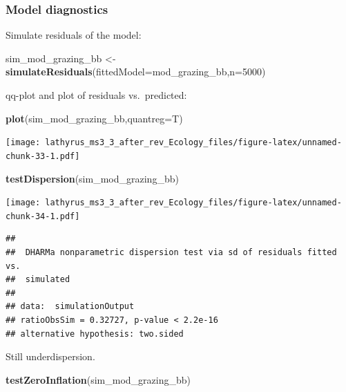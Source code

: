 \documentclass[
]{article}
\newenvironment{Shaded}{\begin{snugshade}}{\end{snugshade}}
\newcommand{\DataTypeTok}[1]{\textcolor[rgb]{0.13,0.29,0.53}{#1}}
\newcommand{\DecValTok}[1]{\textcolor[rgb]{0.00,0.00,0.81}{#1}}
\newcommand{\KeywordTok}[1]{\textcolor[rgb]{0.13,0.29,0.53}{\textbf{#1}}}
\newcommand{\NormalTok}[1]{#1}
\newcommand{\StringTok}[1]{\textcolor[rgb]{0.31,0.60,0.02}{#1}}
\begin{document}
\hypertarget{model-diagnostics-3}{%
\subsubsection{Model diagnostics}\label{model-diagnostics-3}}

Simulate residuals of the model:

\begin{Shaded}
\begin{Highlighting}[]
\NormalTok{sim\_mod\_grazing\_bb \textless{}{-}}\StringTok{ }\KeywordTok{simulateResiduals}\NormalTok{(}\DataTypeTok{fittedModel=}\NormalTok{mod\_grazing\_bb,}\DataTypeTok{n=}\DecValTok{5000}\NormalTok{)}
\end{Highlighting}
\end{Shaded}

qq-plot and plot of residuals vs.~predicted:

\begin{Shaded}
\begin{Highlighting}[]
\KeywordTok{plot}\NormalTok{(sim\_mod\_grazing\_bb,}\DataTypeTok{quantreg=}\NormalTok{T)}
\end{Highlighting}
\end{Shaded}

\texttt{[image: lathyrus\_ms3\_3\_after\_rev\_Ecology\_files/figure-latex/unnamed-chunk-33-1.pdf]}

\begin{Shaded}
\begin{Highlighting}[]
\KeywordTok{testDispersion}\NormalTok{(sim\_mod\_grazing\_bb)}
\end{Highlighting}
\end{Shaded}

\texttt{[image: lathyrus\_ms3\_3\_after\_rev\_Ecology\_files/figure-latex/unnamed-chunk-34-1.pdf]}

\begin{verbatim}
## 
##  DHARMa nonparametric dispersion test via sd of residuals fitted vs.
##  simulated
## 
## data:  simulationOutput
## ratioObsSim = 0.32727, p-value < 2.2e-16
## alternative hypothesis: two.sided
\end{verbatim}

Still underdispersion.

\begin{Shaded}
\begin{Highlighting}[]
\KeywordTok{testZeroInflation}\NormalTok{(sim\_mod\_grazing\_bb)}
\end{Highlighting}
\end{Shaded}
\end{document}
